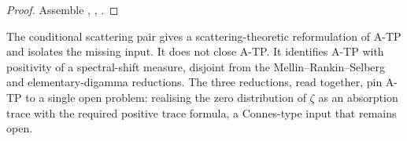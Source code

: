 \begin{proof}
Assemble ,
,
.
\end{proof}

\begin{remark}
\label{v4-arith:w7-j:rem:beilinson}
The conditional scattering pair gives a scattering-theoretic
reformulation of A-TP and isolates the missing input. It does not close
A-TP. It identifies A-TP with positivity of a spectral-shift measure,
disjoint from the Mellin--Rankin--Selberg and elementary-digamma
reductions. The three reductions, read together, pin A-TP to a single
open problem: realising the zero distribution of
\(\zeta\) as an absorption trace with the required positive trace
formula, a Connes-type input that remains open.
\end{remark}
